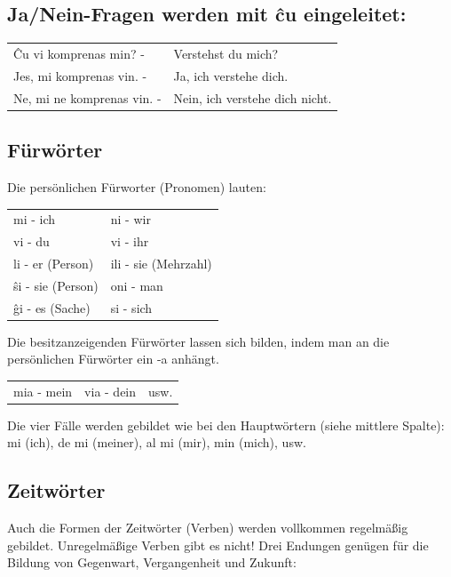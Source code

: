 \vspace{-.2cm}

\subsection{Ja/Nein-Fragen werden mit ĉu eingeleitet:}

\begin{tabular}{ll}
	Ĉu vi komprenas min? -& Verstehst du mich?\\
	Jes, mi komprenas vin. -& Ja, ich verstehe dich.\\
	Ne, mi ne komprenas vin. -& Nein, ich verstehe dich nicht.
\end{tabular}

\clearpage

\subsection{Fürwörter}

\vspace{-.2cm}

Die persönlichen Fürworter (Pronomen) lauten:

\begin{tabular}{ll}
mi - ich & ni - wir\\
vi - du  & vi - ihr\\
li - er (Person) & ili - sie (Mehrzahl)\\
ŝi - sie (Person) & oni - man\\
ĝi - es (Sache) & si - sich
\end{tabular}

Die besitzanzeigenden Fürwörter lassen sich bilden, indem man an die persönlichen Fürwörter ein -a anhängt.

\begin{tabular}{lll}
mia - mein & via - dein & usw.
\end{tabular}

Die vier Fälle werden gebildet wie bei den Hauptwörtern (siehe mittlere Spalte):
mi (ich), de mi (meiner), al mi (mir), min (mich), usw.

\vspace{-.3cm}

\subsection{Zeitwörter}
\hfill\hfill
\vspace{-.7cm}

Auch die Formen der Zeitwörter (Verben) werden vollkommen regelmäßig gebildet. Unregelmäßige Verben gibt es nicht! Drei Endungen genügen für die Bildung von Gegenwart, Vergangenheit und Zukunft:

